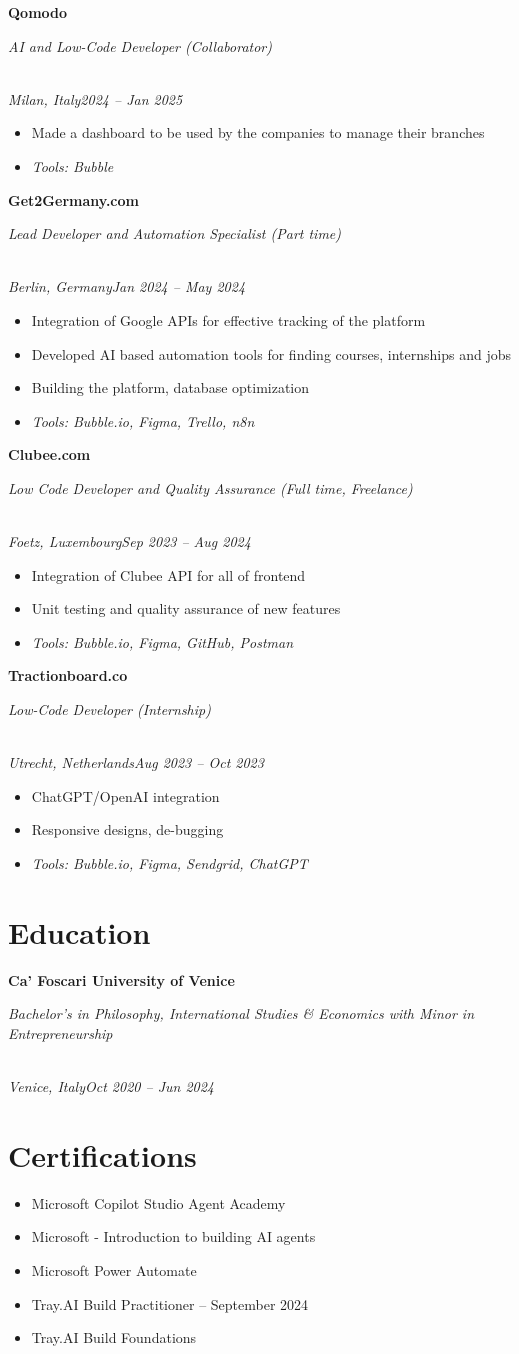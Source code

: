 \documentclass[a4paper,10pt]{article}
\newcommand{\role}[4]{\vspace{3pt}\noindent\hspace{0.6em}\parbox[t]{0.38\textwidth}{\raggedright\textbf{#1}}\hfill\parbox[t]{0.58\textwidth}{\raggedleft\textit{#2}}\\{\textit{#3}\hfill\textit{#4}}\vspace{1pt}}
\begin{document}
\role{Qomodo}{AI and Low-Code Developer (Collaborator)}{Milan, Italy}{2024 -- Jan 2025}
\begin{itemize}
\item Made a dashboard to be used by the companies to manage their branches
\item \textit{Tools: Bubble}
\end{itemize}

\role{Get2Germany.com}{Lead Developer and Automation Specialist (Part time)}{Berlin, Germany}{Jan 2024 -- May 2024}
\begin{itemize}
\item Integration of Google APIs for effective tracking of the platform
\item Developed AI based automation tools for finding courses, internships and jobs
\item Building the platform, database optimization
\item \textit{Tools: Bubble.io, Figma, Trello, n8n}
\end{itemize}

\role{Clubee.com}{Low Code Developer and Quality Assurance (Full time, Freelance)}{Foetz, Luxembourg}{Sep 2023 -- Aug 2024}
\begin{itemize}
\item Integration of Clubee API for all of frontend
\item Unit testing and quality assurance of new features
\item \textit{Tools: Bubble.io, Figma, GitHub, Postman}
\end{itemize}

\role{Tractionboard.co}{Low-Code Developer (Internship)}{Utrecht, Netherlands}{Aug 2023 -- Oct 2023}
\begin{itemize}
\item ChatGPT/OpenAI integration
\item Responsive designs, de-bugging
\item \textit{Tools: Bubble.io, Figma, Sendgrid, ChatGPT}
\end{itemize}

\section{Education}
\role{Ca' Foscari University of Venice}{Bachelor's in Philosophy, International Studies \& Economics with Minor in Entrepreneurship}{Venice, Italy}{Oct 2020 -- Jun 2024}

\section{Certifications}
\begin{itemize}
\item Microsoft Copilot Studio Agent Academy
\item Microsoft - Introduction to building AI agents
\item Microsoft Power Automate
\item Tray.AI Build Practitioner -- September 2024
\item Tray.AI Build Foundations
\end{itemize}
\end{document}
